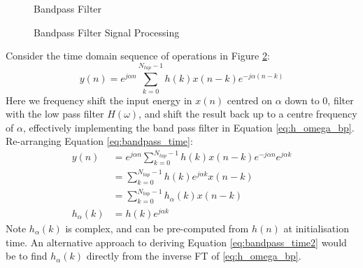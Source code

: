 \documentclass{article}
\begin{document}
\begin{figure}[h]
\caption{Bandpass Filter}
\vspace{5mm}
\label{fig:bandpass_freq}
\centering
{}
\end{figure}

\begin{figure}[h]
\caption{Bandpass Filter Signal Processing}
\label{fig:bandpass_proc}
\vspace{5mm}
\begin{center}
\end{center}
\end{figure}

Consider the time domain sequence of operations in Figure \ref{fig:bandpass_proc}:
\begin{equation} \label{eq:bandpass_time}
y(n) = e^{j \alpha n} \sum_{k=0}^{N_{tap}-1} h(k) x(n-k) e^{-j \alpha (n-k)}
\end{equation}
Here we frequency shift the input energy in $x(n)$ centred on $\alpha$ down to 0, filter with the low pass filter $H(\omega)$, and shift the result back up to a centre frequency of $\alpha$, effectively implementing the band pass filter in Equation \ref{eq:h_omega_bp}.  Re-arranging Equation \ref{eq:bandpass_time}:
\begin{equation} \label{eq:bandpass_time2}
\begin{split}
y(n) &= e^{j \alpha n} \sum_{k=0}^{N_{tap}-1}  h(k) x(n-k) e^{-j \alpha n} e^{j \alpha k} \\
     &= \sum_{k=0}^{N_{tap}-1} h(k) e^{j \alpha k} x(n-k) \\
     &= \sum_{k=0}^{N_{tap}-1} h_{\alpha}(k) x(n-k) \\
h_{\alpha}(k) &= h(k) e^{j \alpha k}     
\end{split}
\end{equation}
Note $h_{\alpha}(k)$ is complex, and can be pre-computed from $h(n)$ at initialisation time. An alternative approach to deriving Equation \ref{eq:bandpass_time2} would be to find $h_{\alpha}(k)$ directly from the inverse FT of \eqref{eq:h_omega_bp}.
\end{document}
